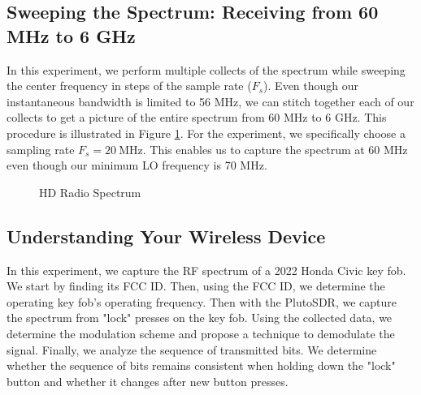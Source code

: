 \documentclass{article}
\begin{document}
\subsection{Sweeping the Spectrum: Receiving from 60 MHz to 6 GHz}

In this experiment, we perform multiple collects of the spectrum while sweeping the center frequency in steps of the sample rate ($F_s$). Even though our instantaneous bandwidth is limited to 56 MHz, we can stitch together each of our collects to get a picture of the entire spectrum from 60 MHz to 6 GHz. This procedure is illustrated in Figure \ref{fig::sweeping_the_spectrum}. For the experiment, we specifically choose a sampling rate $F_s = 20\ \text{MHz}$. This enables us to capture the spectrum at 60 MHz even though our minimum LO frequency is 70 MHz. 

\begin{figure}[H]
	\centerline{}
	\caption{HD Radio Spectrum}
	\label{fig::sweeping_the_spectrum}
\end{figure}

\subsection{Understanding Your Wireless Device}

In this experiment, we capture the RF spectrum of a 2022 Honda Civic key fob. 
We start by finding its FCC ID. Then, using the FCC ID, we determine the operating key fob's operating frequency. Then with the PlutoSDR, we capture the spectrum from "lock" presses on the key fob. Using the collected data, we determine the modulation scheme and propose a technique to demodulate the signal. Finally, we analyze the sequence of transmitted bits. We determine whether the sequence of bits remains consistent when holding down the "lock" button and whether it changes after new button presses.
\end{document}
